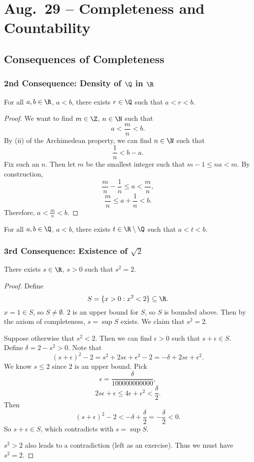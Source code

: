 \chapter{Aug.~29 -- Completeness and Countability}

\section{Consequences of Completeness}

\subsection{2nd Consequence: Density of $\Q$ in $\R$}
\begin{theorem}[Density of $\Q$ in $\R$]
For all $a, b \in \R$, $a < b$, there exists
$r \in \Q$ such that $a < r < b$.
\end{theorem}

\begin{proof}
  We want to find $m \in \Z$, $n \in \N$ such that
  \[
  a < \frac{m}{n} < b
  .\]
  By (ii) of the Archimedean property, we can find
  $n \in \N$ such that
  \[
  \frac{1}{n} < b - a
  .\]
  Fix such an $n$. Then let $m$ be the smallest integer
  such that $m - 1 \le na < m$. By construction,
  \[
  \frac{m}{n} - \frac{1}{n} \le a < \frac{m}{n},
  \]
  \[\frac{m}{n} \le a + \frac{1}{n} < b.\]
  Therefore, $a < \frac{m}{n} < b$.
\end{proof}

\begin{corollary}
  For all $a, b \in \Q$, $a < b$, there exists
   $t \in \R \setminus \Q$ such that  $a < t < b$.
\end{corollary}

\subsection{3rd Consequence: Existence of $\sqrt{2}$}
\begin{theorem}
  There exists $s \in \R$, $s > 0$ such that $s^2 = 2$.
\end{theorem}

\begin{proof}
  Define
  \[S = \{x > 0 : x^2 < 2\} \subseteq \R.\]
  $x = 1 \in S$, so $S \ne \emptyset$. $2$ is an upper
  bound for $S$, so $S$ is bounded above. Then by the
  axiom of completeness, $s = \sup S$ exists.
  We claim that $s^2 = 2$. 

  Suppose otherwise that $s^2 < 2$. Then we can find
  $\epsilon > 0$ such that $s + \epsilon \in S$.
  Define $\delta = 2 - s^2 > 0$. Note that
  \[(s + \epsilon)^2 - 2 = s^2 + 2s\epsilon + \epsilon^2 - 2 = -\delta + 2s\epsilon + \epsilon^2.\]
  We know $s \le 2$ since $2$ is an upper bound. 
  Pick
  \[\epsilon = \frac{\delta}{100000000000},\]
  \[
  2s\epsilon + \epsilon \le 4\epsilon + \epsilon^2 < \frac{\delta}{2}
  .\]
  Then
  \[
  (s + \epsilon)^2 - 2 < -\delta + \frac{\delta}{2}
  = -\frac{\delta}{2} < 0
  .\]
  So $s + \epsilon \in S$, which contradicts with
  $s = \sup S$.

  $s^2 > 2$ also leads to a contradiction
  (left as an exercise). Thus we must have $s^2 = 2$.
\end{proof}


